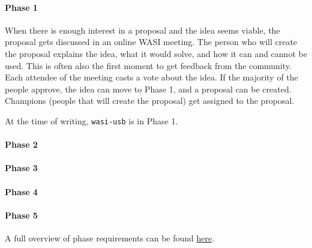 \paragraph{Phase 1}
When there is enough interest in a proposal and the idea seems viable, the proposal gets discussed in an online WASI meeting. The person who will create the proposal explains the idea, what it would solve, and how it can and cannot be used. This is often also the first moment to get feedback from the community. Each attendee of the meeting casts a vote about the idea. If the majority of the people approve, the idea can move to Phase 1, and a proposal can be created. Champions (people that will create the proposal) get assigned to the proposal.

At the time of writing, \texttt{wasi-usb} is in Phase 1.

\paragraph{Phase 2}



\paragraph{Phase 3}

\paragraph{Phase 4}

\paragraph{Phase 5}


A full overview of phase requirements can be found \href{https://github.com/WebAssembly/meetings/blob/main/process/phases.md}{here}.


